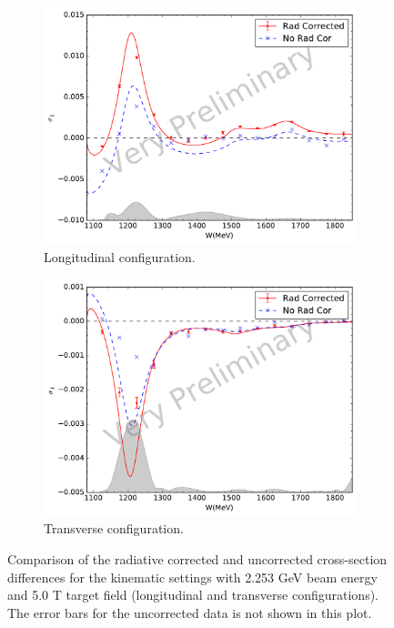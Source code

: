 \begin{figure}[p!]
  \centering
  \begin{subfigure}[t]{0.79\textwidth}
    \includegraphics[width=\textwidth]{figs/xsdiff-model-22535000.pdf}
    \caption{Longitudinal configuration. \label{C8S3F1a}}
  \end{subfigure}
  \begin{subfigure}[t]{0.79\textwidth}
    \includegraphics[width=\textwidth]{figs/xsdiff-model-22535090.pdf}
    \caption{Transverse configuration. \label{C8S3F1b}}
  \end{subfigure}
  \caption[Cross-section differences with $E=2.253$ GeV and $B=5.0$ T.]{Comparison of the radiative corrected and uncorrected cross-section differences for the kinematic settings with 2.253 GeV beam energy and 5.0 T target field (longitudinal and transverse configurations). The error bars for the uncorrected data is not shown in this plot. \label{C8S3F1}}
\end{figure}

